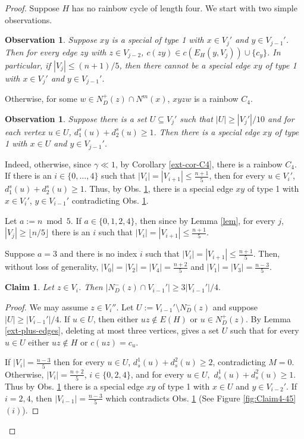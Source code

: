 \documentclass{article}
\newtheorem{obs}[theorem]{Observation}
\newtheorem{claim}[theorem]{Claim}
\begin{document}
\begin{proof}
Suppose $H$ has no rainbow cycle of length four.
We start with two  simple observations.
\begin{obs}\label{obs1}
   Suppose $xy$ is a special of type 1 with $x\in V_{j}'$ and $y\in V_{j-1}'$. Then for every edge $zy$ with $z\in V_{j-2}$, $c(zy)\in c(E_H(y, V_j))\cup \{c_y\}$. In particular, if $|V_{j}|\leq (n+1)/5$, then there cannot be a special edge $xy$ of type 1 with  $x\in V_j'$ and $y\in V_{j-1}'.$ 
\end{obs}
Otherwise,  for some $w\in N^+_D(z)\cap N^m(x)$,  $xyzw$ is a  rainbow $C_4$. 
\begin{obs}\label{obs2}
    Suppose there is a set $U\subseteq V_j'$ such that $|U|\geq |V_j'|/10$ and  for each vertex $u\in U$, $d^s_1(u)+d^s_2(u)\geq 1$. Then there is a special edge $xy$ of type 1 with $x\in U$ and $y\in V_{j-1}'$.
\end{obs}
Indeed, otherwise, since $\gamma \ll 1$, by Corollary \ref{ext-cor-C4}, there is  a rainbow $C_4$. \\


If there is an $i\in \{0,\dots, 4\}$ such that $|V_i|= |V_{i+1}|\leq  \frac{n+1}{5}$, then for every $u\in V_i'$, $d^s_1(u)+d^s_2(u)\geq 1$. Thus, by Obs. \ref{obs2}, there is a special edge $xy$  of type 1 with $x\in V_i'$, $y\in V_{i-1}'$ contradicting  Obs. \ref{obs1}.

Let $a:= n \bmod 5$. If  $a \in \{0, 1, 2, 4\}$, then since by Lemma \ref{lem}, for every $j$, $|V_j|\geq \lfloor n/5 \rfloor$  there is an $i$ such that $|V_i|= |V_{i+1}|\leq  \frac{n+1}{5}$. 

Suppose $a= 3$ and there is no index $i$ such that $|V_i|= |V_{i+1}|\leq  \frac{n+1}{5}$. 
Then, without loss of generality, $|V_0|= |V_2|= |V_4|= \frac{n+2}{5}$ and $|V_1|=|V_3|= \frac{n-3}{5}$.  

\begin{claim}\label{extC4-cl1}
    Let $z\in V_i$. Then $|N^-_D(z)\cap V_{i-1}'|\geq 3|V_{i-1}'|/4.$
\end{claim}
\begin{proof}
    We may assume $z\in V_i''$.  Let $U:= V_{i-1}'\setminus N^-_D(z)$ and suppose $|U|\geq |V_{i-1}'|/4.$ If $u\in U$, then either $uz\notin E(H)$ or $u\in N^+_D(z).$ By Lemma \ref{ext-plus-edges}, deleting at most three vertices, gives a set $U$ such that for every $u\in U$ either $uz\notin H$ or $c(uz)=c_u$. 
    
    If $|V_i|=\frac{n-3}{5}$ then for every $u\in U$, $d_s^1(u)+d_s^2(u)\geq 2$, contradicting $M=0$. Otherwise, $|V_i|=\frac{n+2}{5}$, $i\in \{0,2,4 \}$, and for every $u\in U,$ $d_s^1(u)+d_s^2(u)\geq 1$. Thus by Obs. \ref{obs2} there is a special edge $xy$ of type 1 with $x\in U$ and $y\in V_{i-2}'$.
    If $i=2,4$, then $|V_{i-1}|=\frac{n-3}{5}$ which contradicts Obs. \ref{obs1} (See Figure \ref{fig:Claim4-45}$(i)$). 
    

\end{proof}
\end{proof}
\end{document}
